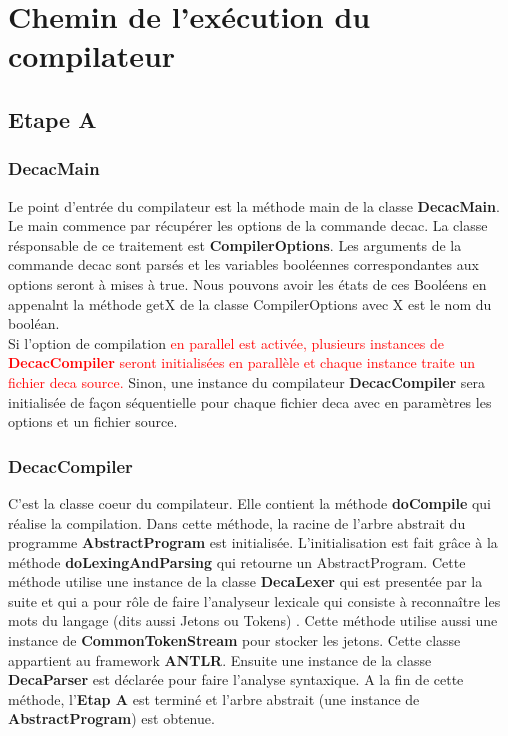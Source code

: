 \documentclass[12pt, a4paper, one side]{article}
\begin{document}
    \section{Chemin de l'exécution du compilateur}
    \subsection{Etape A}

    \subsubsection{DecacMain}
    Le point d'entrée du compilateur est la méthode main de la classe \textbf {DecacMain}. Le main commence par récupérer les options de la commande decac. La classe résponsable de ce traitement est \textbf{CompilerOptions}. Les arguments de la commande decac sont parsés et les variables booléennes correspondantes aux options seront à mises à true. Nous pouvons avoir les états de ces Booléens en appenalnt la méthode getX de la classe CompilerOptions avec X est le nom du booléan.
    \\
    Si l'option de compilation {\textcolor{red}{ en parallel est activée, plusieurs instances de \textbf{DecacCompiler} seront initialisées en parallèle et chaque instance traite un fichier deca source.}}
    Sinon, une instance du compilateur \textbf{DecacCompiler} sera initialisée de façon séquentielle pour chaque fichier deca avec en paramètres les options et un fichier source.

    \subsubsection{DecacCompiler} C'est la classe coeur du compilateur. Elle contient la méthode \textbf{doCompile} qui réalise la compilation. Dans cette méthode, la racine de l'arbre abstrait du programme \textbf{AbstractProgram} est initialisée. L'initialisation est fait grâce à la méthode \textbf{doLexingAndParsing} qui retourne un AbstractProgram. Cette méthode utilise une instance de la classe \textbf{DecaLexer} qui est presentée par la suite et qui a pour rôle de faire l'analyseur lexicale qui consiste à reconnaître les mots du langage (dits aussi Jetons ou Tokens) . Cette méthode utilise aussi une instance de \textbf{CommonTokenStream} pour stocker les
    jetons. Cette classe appartient au framework \textbf{ANTLR}. Ensuite une instance de la classe \textbf{DecaParser} est déclarée pour faire l'analyse syntaxique. A la fin de cette méthode, l'\textbf{Etap A} est terminé et l'arbre abstrait (une instance de \textbf{AbstractProgram}) est obtenue.
\end{document}
